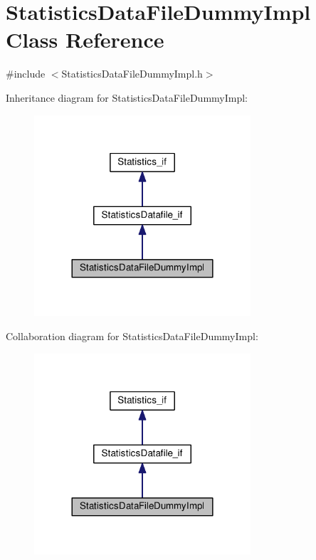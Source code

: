 \hypertarget{class_statistics_data_file_dummy_impl}{}\section{Statistics\+Data\+File\+Dummy\+Impl Class Reference}
\label{class_statistics_data_file_dummy_impl}


{\ttfamily \#include $<$Statistics\+Data\+File\+Dummy\+Impl.\+h$>$}



Inheritance diagram for Statistics\+Data\+File\+Dummy\+Impl\+:\nopagebreak
\begin{figure}[H]
\begin{center}
\leavevmode
\includegraphics[width=228pt]{class_statistics_data_file_dummy_impl__inherit__graph}
\end{center}
\end{figure}


Collaboration diagram for Statistics\+Data\+File\+Dummy\+Impl\+:\nopagebreak
\begin{figure}[H]
\begin{center}
\leavevmode
\includegraphics[width=228pt]{class_statistics_data_file_dummy_impl__coll__graph}
\end{center}
\end{figure}
